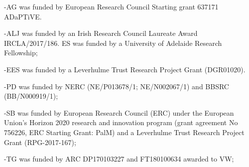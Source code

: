 \documentclass[12pt,letterpaper]{article}
\begin{document}
-AG was funded by European Research Council Starting grant 637171 ADaPTiVE.

-ALJ was funded by an Irish Research Council Laureate Award IRCLA/2017/186. ES was funded by a University of Adelaide Research Fellowship;

-EES was funded by a Leverhulme Trust Research Project Grant (DGR01020).

-PD was funded by NERC (NE/P013678/1; NE/N002067/1) and BBSRC (BB/N000919/1);

-SB was funded by European Research Council (ERC) under the European Union's Horizon 2020 research and innovation program (grant agreement No 756226, ERC Starting Grant: PalM) and a Leverhulme Trust Research Project Grant (RPG-2017-167);

-TG was funded by ARC DP170103227 and FT180100634 awarded to VW;




\end{document}
